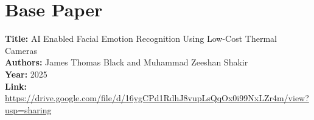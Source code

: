 \documentclass[12pt,a4paper]{report}
\begin{document}
\section*{Base Paper}
{}
\begin{raggedright}
\textbf{Title:} AI Enabled Facial Emotion Recognition Using Low-Cost Thermal Cameras\\
\textbf{Authors:} James Thomas Black and Muhammad Zeeshan Shakir\\
\textbf{Year:} 2025\\
\textbf{Link:} \url{https://drive.google.com/file/d/16ygCPd1RdhJ8vupLsQqOx0i99NxLZr4m/view?usp=sharing}
\end{raggedright}




\printbibliography[heading=bibintoc,title={References}]
\end{document}
